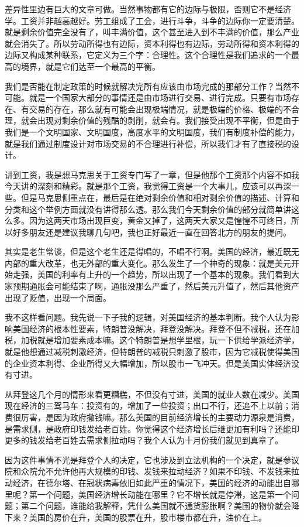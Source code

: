 \documentclass[UTF8, 12pt, a4paper]{ctexrep}
\begin{document}
差异性里边有巨大的文章可做。当然事物都有它的边际与极限，否则它不是经济学。工资并非越高越好。劳工组成了工会，进行斗争，斗争的边际你一定要清楚。就是剩余价值完全没有了，叫丰满价值，这个甚至进入到不丰满的价值，那么产业就会消失了。所以劳动所得也有边际，资本利得也有边际，劳动所得和资本利得的边际又构成某种联系，它定义为三个字：合理性。这个合理性是我们追求的一个最高的境界，就是它们达至一个最高的平衡。

我们是否能在制定政策的时候就解决完所有应该由市场完成的那部分工作？当然不可能。就是一个国家大部分的事情还是由市场进行交易、进行完成。只要有市场存在、有交易的存在，那么就有可能会出现极端情况，就是极端的价格、极端的不合理，就会出现对剩余价值的残酷的剥削，就会有。我们接受出现不平衡，但是由于我们是一个文明国家、文明国度，高度水平的文明国度，我们有制度补偿的能力，就是我们通过制度设计对市场交易的不合理进行补偿，所以我们才有了直接税的设计。

讲到工资，我是想马克思关于工资专门写了一章，但是他那个工资那个内容不如我今天讲的深刻和精彩。就是那个工资，我觉得工资是一个大事儿，应该可以再深一些。但是马克思侧重点在，最后是在绝对剩余价值和相对剩余价值的描述、计算和分类和这个举例方面就没有讲得那么透。那么我们今天剩余价值的部分就简单讲这么多。因为这两天市场出现巨变，黄金又掉了，这两天大家又是惶惶不可终日，所以好多朋友还是建议我聊几句吧，我也正好最近一直在回答北方的朋友的提问。

其实是老生常谈，但是这个老生还是得唱的，不唱不行啊。美国的经济，最近既无内部的重大改革，也无外部的重大变化。那么发生了一个神奇的现象：就是美元开始走强，美国的利率有上升的一个趋势，所以出现了一个基本的现象。我们看到大家预期通胀会可能结束了啊，通胀没那么严重了，然后美元升值了，然后其他资产出现了贬值，出现一个局面。

我不这样看问题。我先说一下子我的逻辑，对美国经济的基本判断。我个人认为影响美国经济的根本性要素，特朗普没解决，拜登没解决。拜登不但不减税，还在加税，加税就是增加要素成本嘛。这个特朗普是想学里根，玩一下供给学派经济学，就是他想通过减税刺激经济，但特朗普的减税只刺激了股市，因为它减税使得美国的企业资本利得、企业所得又大幅增加，所以股市一飞冲天。但是美国实体经济没有寸进。

从拜登这几个月的情形来看更糟糕，不但没有寸进，美国的就业人数在减少。美国现在经济的三驾马车：投资有的，增加了一些投资；出口不行，还追不上以前；消费很厉害，是因为政府撒钱嘛。那么美国的目前经济增长的主要动力源泉是消费，是需求侧，是政府印钱发给老百姓。你觉得这个经济增长后继更加有利吗？还能印更多的钱发给老百姓去需求侧拉动吗？我个人认为十月份我们就见到真章了。

因为这件事情不光是拜登个人的决定，它也涉及到立法机构的一个决定，就是参议院和众院允不允许他再大规模的印钱、发钱来拉动经济？如果不印钱、不发钱来拉动经济，在德尔塔、在冠状病毒依旧如此严重的情况下，美国的经济的动能出自哪里呢？第一个问题，美国经济增长动能在哪里？它不增长就是停滞，这是第一个问题；第二个问题，谁能给我解释，凭什么美国就不通货膨胀啊？美国的物价就会降下来？美国的房价在升，美国的股票在升，股市楼市都在升，油价在上。
\end{document}
